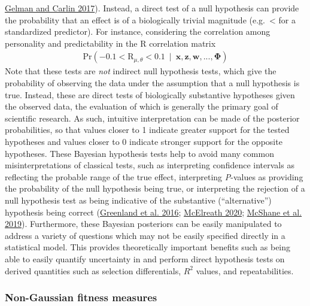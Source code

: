 \documentclass{article}
\begin{document}
\protect\hyperlink{ref-Gelman2017}{Gelman and Carlin 2017}). Instead, a
direct test of a null hypothesis can provide the probability that an
effect is of a biologically trivial magnitude (e.g.~\textless{}
\textbar{} for a standardized predictor). For instance,
considering the correlation among personality and predictability in the
\(\boldsymbol{\mathrm{R}}\) correlation matrix \begin{align*}
\mathrm{Pr}\left( -0.1 < \boldsymbol{\mathrm{R}}_{\mu, \theta}  < 0.1  \ \mid \ \boldsymbol{x},\boldsymbol{z},\boldsymbol{w},...,\boldsymbol{\Phi} \right)
\end{align*} Note that these tests are \emph{not} indirect null
hypothesis tests, which give the probability of observing the data under
the assumption that a null hypothesis is true. Instead, these are direct
tests of biologically substantive hypotheses given the observed data,
the evaluation of which is generally the primary goal of scientific
research. As such, intuitive interpretation can be made of the posterior
probabilities, so that values closer to 1 indicate greater support for
the tested hypotheses and values closer to 0 indicate stronger support
for the opposite hypotheses. These Bayesian hypothesis tests help to
avoid many common misinterpretations of classical tests, such as
interpreting confidence intervals as reflecting the probable range of
the true effect, interpreting \emph{P}-values as providing the
probability of the null hypothesis being true, or interpreting the
rejection of a null hypothesis test as being indicative of the
substantive (``alternative'') hypothesis being correct
(\protect\hyperlink{ref-Green2016}{Greenland et al. 2016};
\protect\hyperlink{ref-Rethinking}{McElreath 2020};
\protect\hyperlink{ref-McShane2019}{McShane et al. 2019}). Furthermore,
these Bayesian posteriors can be easily manipulated to address a variety
of questions which may not be easily specified directly in a statistical
model. This provides theoretically important benefits such as being able
to easily quantify uncertainty in and perform direct hypothesis tests on
derived quantities such as selection differentials, \(R^2\) values, and
repeatabilities.

\hypertarget{non-gaussian-fitness-measures}{%
\subsubsection{Non-Gaussian fitness
measures}\label{non-gaussian-fitness-measures}}
\end{document}
